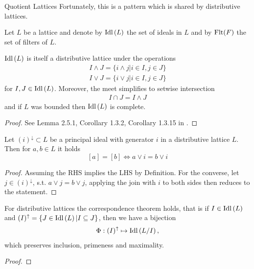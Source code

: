 \begin{subsection}{Quotient Lattices}
    Fortunately, this is a pattern which is shared by distributive lattices. 
    \begin{definition}
        Let \( L \) be a lattice and denote by \( \text{Idl}\left (L \right) \) the set of ideals in \( L \)
        and by \( \textnormal{Flt}({F}) \) the set of filters of \( L \).
    \end{definition}
    \begin{proposition}
        \( \text{Idl}\left (L \right) \) is itself a distributive lattice under the operations
        \begin{align*}
            I \wedge J = \{ i \wedge j | i \in I, j \in J \} \\
            I \vee J = \{ i \vee j | i \in I, j \in J \}
        \end{align*}
        for \( I, J \in \text{Idl}\left (L \right) \). Moreover, the meet simplifies to setwise intersection
        \begin{align*}
            I \cap J = I \wedge J
        \end{align*}
        and if \( L \) was bounded then \( \text{Idl}\left (L \right) \) is complete.
    \end{proposition}
    \begin{proof}
        See Lemma 2.5.1, Corollary 1.3.2, Corollary 1.3.15 in \cite{genlattheorygraetzer}.
    \end{proof}
    \begin{lemma} \label{lemmaprincipalequivalence}
        Let \( (i)^\downarrow \subset L \) be a principal ideal with generator \( i \) in a distributive lattice \( L \).
        Then for \( a, b \in L \) it holds
        \[
            [a] = [b] \iff a \vee i = b \vee i
        \]
    \end{lemma}
    \begin{proof}
        Assuming the RHS implies the LHS by Definition. For the converse, let \( j \in (i)^\downarrow \),
        s.t. \( a \vee j = b \vee j \), applying the join with \( i \) to both sides then reduces to the statement.
    \end{proof}
    \begin{proposition} \label{correspondencetheorem}
        For distributive lattices the correspondence theorem holds, that is if \( I \in \text{Idl}\left (L \right) \)
        and \( (I)^\uparrow = \{ J \in \text{Idl}\left (L \right) | I \subseteq J \} \), then we have a bijection
        \[
            \Phi : (I)^\uparrow \mapsto \text{Idl}\left (L/I \right),
        \]
        which preserves inclusion, primeness and maximality.
    \end{proposition}
    \begin{proof}

\end{proof}
\end{subsection}
